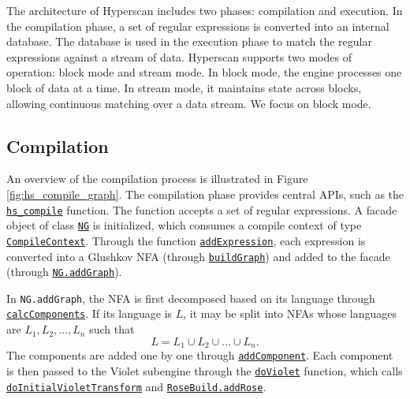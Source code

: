 The architecture of Hyperscan includes two phases: compilation and execution. In the compilation phase, a set of regular expressions is converted into an internal database. The database is used in the execution phase to match the regular expressions against a stream of data. Hyperscan supports two modes of operation: block mode and stream mode. In block mode, the engine processes one block of data at a time. In stream mode, it maintains state across blocks, allowing continuous matching over a data stream. We focus on block mode.

\subsection{Compilation}

An overview of the compilation process is illustrated in Figure \ref{fig:hs_compile_graph}. The compilation phase provides central APIs, such as the \href{https://github.com/intel/hyperscan/blob/master/src/hs_compile.h#L360}{\texttt{hs\_compile}} function. The function accepts a set of regular expressions. A facade object of class \href{https://github.com/intel/hyperscan/blob/master/src/nfagraph/ng.h#L63}{\texttt{NG}} is initialized, which consumes a compile context of type \href{https://github.com/intel/hyperscan/blob/master/src/util/compile_context.h#L43}{\texttt{CompileContext}}. Through the function \href{https://github.com/intel/hyperscan/blob/master/src/compiler/compiler.h#L116}{\texttt{addExpression}}, each expression is converted into a Glushkov NFA \cite{glushkov1961abstract} (through \href{https://github.com/intel/hyperscan/blob/master/src/compiler/compiler.h#L151}{\texttt{buildGraph}}) and added to the facade (through \href{https://github.com/intel/hyperscan/blob/master/src/nfagraph/ng.h#L71}{\texttt{NG.addGraph}}).

In \texttt{NG.addGraph}, the NFA is first decomposed based on its language through \href{https://github.com/intel/hyperscan/blob/master/src/nfagraph/ng_calc_components.h#L47}{\texttt{calcComponents}}. If its language is $L$, it may be split into NFAs whose languages are $L_1, L_2, \ldots, L_n$ such that
$$L = L_1 \cup L_2 \cup \ldots \cup L_n.$$
The components are added one by one through \href{https://github.com/intel/hyperscan/blob/master/src/nfagraph/ng.cpp#L205}{\texttt{addComponent}}. Each component is then passed to the Violet subengine through the \href{https://github.com/intel/hyperscan/blob/master/src/nfagraph/ng_violet.h#L49}{\texttt{doViolet}} function, which calls \href{https://github.com/intel/hyperscan/blob/master/src/nfagraph/ng_violet.cpp#L2989}{\texttt{doInitialVioletTransform}} and \href{https://github.com/intel/hyperscan/blob/master/src/rose/rose_build_impl.h#L507}{\texttt{RoseBuild.addRose}}.

